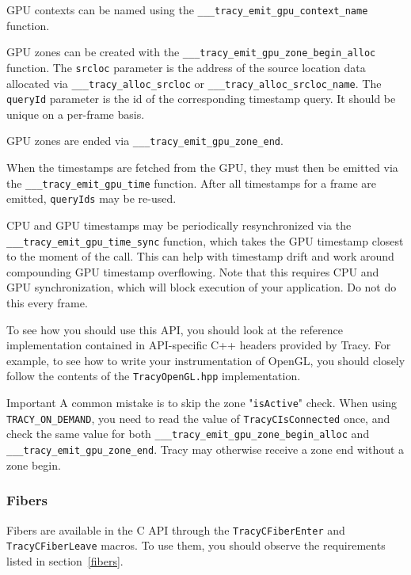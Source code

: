 \documentclass[hidelinks,titlepage,a4paper,twoside]{article}
\begin{document}
GPU contexts can be named using the \texttt{\_\_\_tracy\_emit\_gpu\_context\_name} function.

GPU zones can be created with the \texttt{\_\_\_tracy\_emit\_gpu\_zone\_begin\_alloc} function. The \texttt{srcloc} parameter is the address of the source location data allocated via \texttt{\_\_\_tracy\_alloc\_srcloc} or \texttt{\_\_\_tracy\_alloc\_srcloc\_name}. The \texttt{queryId} parameter is the id of the corresponding timestamp query. It should be unique on a per-frame basis.

GPU zones are ended via \texttt{\_\_\_tracy\_emit\_gpu\_zone\_end}.

When the timestamps are fetched from the GPU, they must then be emitted via the \texttt{\_\_\_tracy\_emit\_gpu\_time} function. After all timestamps for a frame are emitted, \texttt{queryIds} may be re-used.

CPU and GPU timestamps may be periodically resynchronized via the \texttt{\_\_\_tracy\_emit\_gpu\_time\_sync} function, which takes the GPU timestamp closest to the moment of the call. This can help with timestamp drift and work around compounding GPU timestamp overflowing. Note that this requires CPU and GPU synchronization, which will block execution of your application. Do not do this every frame.

To see how you should use this API, you should look at the reference implementation contained in API-specific C++ headers provided by Tracy. For example, to see how to write your instrumentation of OpenGL, you should closely follow the contents of the \texttt{TracyOpenGL.hpp} implementation.


\begin{bclogo}[
	noborder=true,
	couleur=black!5,
	logo=\bcbombe
	]{Important}
A common mistake is to skip the zone "\texttt{isActive}" check. When using \texttt{TRACY\_ON\_DEMAND}, you need to read the value of \texttt{TracyCIsConnected} once, and check the same value for both \newline \texttt{\_\_\_tracy\_emit\_gpu\_zone\_begin\_alloc} and \texttt{\_\_\_tracy\_emit\_gpu\_zone\_end}. Tracy may otherwise receive a zone end without a zone begin.
\end{bclogo}

\subsubsection{Fibers}

Fibers are available in the C API through the \texttt{TracyCFiberEnter} and \texttt{TracyCFiberLeave} macros. To use them, you should observe the requirements listed in section~\ref{fibers}.
\end{document}
